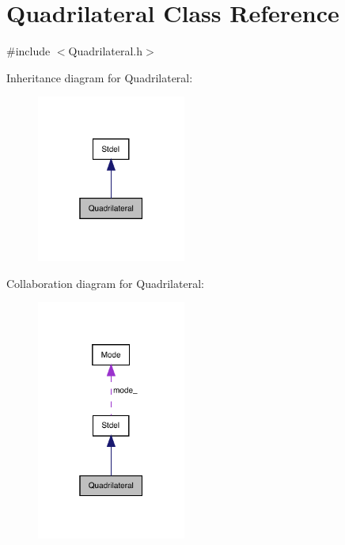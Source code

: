 \hypertarget{classQuadrilateral}{}\section{Quadrilateral Class Reference}
\label{classQuadrilateral}


{\ttfamily \#include $<$Quadrilateral.\+h$>$}



Inheritance diagram for Quadrilateral\+:
\nopagebreak
\begin{figure}[H]
\begin{center}
\leavevmode
\includegraphics[width=139pt]{classQuadrilateral__inherit__graph}
\end{center}
\end{figure}


Collaboration diagram for Quadrilateral\+:
\nopagebreak
\begin{figure}[H]
\begin{center}
\leavevmode
\includegraphics[width=139pt]{classQuadrilateral__coll__graph}
\end{center}
\end{figure}
